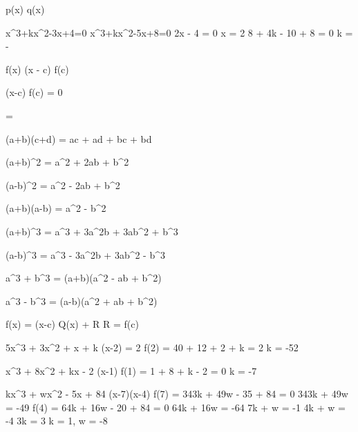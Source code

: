 
 p(x)  q(x)\text{:}

 x^3+kx^2-3x+4=0  x^3+kx^2-5x+8=0
 2x - 4 = 0 \Rightarrow x = 2
 8 + 4k - 10 + 8 = 0 \Rightarrow k = -

 f(x) \div (x - c)  f(c)

 (x-c)  \iff f(c) = 0

 = \pm{}


(a+b)(c+d) = ac + ad + bc + bd

(a+b)^2 = a^2 + 2ab + b^2

(a-b)^2 = a^2 - 2ab + b^2

(a+b)(a-b) = a^2 - b^2

(a+b)^3 = a^3 + 3a^2b + 3ab^2 + b^3

(a-b)^3 = a^3 - 3a^2b + 3ab^2 - b^3

a^3 + b^3 = (a+b)(a^2 - ab + b^2)

a^3 - b^3 = (a-b)(a^2 + ab + b^2)

 f(x) = (x-c) \cdot Q(x) + R R = f(c)

5x^3 + 3x^2 + x + k \div (x-2) = 2
f(2) = 40 + 12 + 2 + k = 2 \Rightarrow k = -52

x^3 + 8x^2 + kx - 2  (x-1)
f(1) = 1 + 8 + k - 2 = 0 \Rightarrow k = -7

 kx^3 + wx^2 - 5x + 84 (x-7)(x-4)
f(7) = 343k + 49w - 35 + 84 = 0 \Rightarrow 343k + 49w = -49
f(4) = 64k + 16w - 20 + 84 = 0 \Rightarrow 64k + 16w = -64
 7k + w = -1 4k + w = -4
\Rightarrow 3k = 3 \Rightarrow k = 1,\; w = -8


